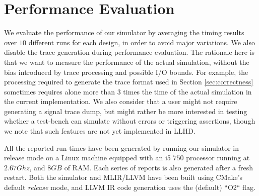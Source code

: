 
\section{Performance Evaluation}
We evaluate the performance of our simulator by averaging the timing results over $10$ different runs for each design, in order to avoid major variations. We also disable the trace generation during performance evaluation. The rationale here is that we want to measure the performance of the actual simulation, without the bias introduced by trace processing and possible I/O bounds. For example, the processing required to generate the trace format used in Section \ref{sec:correctness} sometimes requires alone more than $3$ times the time of the actual simulation in the current implementation. We also consider that a user might not require generating a signal trace dump, but might rather be more interested in testing whether a test-bench can simulate without errors or triggering assertions, though we note that such features are not yet implemented in LLHD.

All the reported run-times have been generated by running our simulator in release mode on a Linux machine equipped with an i5 $750$ processor running at $2.67Ghz$, and $8GB$ of RAM. Each series of reports is also generated after a fresh restart. Both the simulator and MLIR/LLVM have been built using CMake's default \textit{release} mode, and LLVM IR code generation uses the (default) “O2“ flag.

